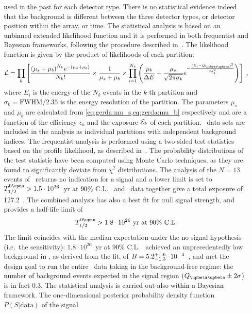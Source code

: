used in the past for each detector type. There is no statistical evidence indeed that the
background is different between the three detector types, or detector position within the
array, or time.
\newpar
The statistical analysis is based on an unbinned extended likelihood function and it is
performed in both frequentist and Bayesian frameworks, following the procedure described
in~\cite{Agostini2017}. The likelihood function is given by the product of likelihoods of
each partition:
\[
  \mathcal{L} = \prod_k \left[
    \frac{{(\mu_s + \mu_b)}^{N_k} e^{-(\mu_s + \mu_b)}}{N_k!} \times
    \frac{1}{\mu_s + \mu_b} \times
    \prod^{N_k}_{i=1} \left(
      \frac{\mu_b}{\Delta{}E} +
      \frac{\mu_s}{\sqrt{2\pi\sigma_k}} e^{-\frac{{(E_i - \qbbM)}^2}{2\sigma_k^2}}
    \right)
  \right] \;,
\]
where $E_i$ is the energy of the $N_k$ events in the $k$-th partition and $\sigma_k =
\text{FWHM}/2.35$ is the energy resolution of the partition. The parameters $\mu_s$ and
$\mu_b$ are calculated from \cref{eq:gerda:mu_s,eq:gerda:mu_b} respectively and are a
function of the efficiency $\epsilon_k$ and the exposure $\mathcal{E}_k$ of each partition.
\phaseone\ data sets are included in the analysis as individual partitions with
independent background indices.
\newpar
The frequentist analysis is performed using a two-sided test statistics based on the
profile likelihood, as described in~\cite{Agostini2017}. The probability distributions of
the test statistic have been computed using Monte Carlo techniques, as they are found to
significantly deviate from $\chi^2$ distributions. The analysis of the $N=13$ events of
\phasetwo\ returns no indication for a signal and a lower limit is set to $\thalfzeroM >
1.5 \cdot 10^{26}$~yr at 90\% C.L. \phaseone\ and \phasetwo\ data together give a total
exposure of 127.2~\kgyr. The combined analysis has also a best fit for null signal
strength, and provides a half-life limit of
\[
  \thalfzeroM > 1.8 \cdot 10^{26}~\text{yr at 90\% C.L.}
\]
The limit coincides with the median expectation under the no-signal hypothesis (i.e.~the
sensitivity): $1.8 \cdot 10^{26}$~yr at 90\% C.L. \gerda\ achieved an unprecedentedly low
background in \phasetwo, as derived from the fit, of $B = {5.2}\substack{+1.6 \\ -1.3}
\cdot 10^{-4}$~\ctsper, and met the design goal to run the entire \phaseone\ data taking
in the background-free regime: the number of background events expected in the signal
region ($\qbbM \pm 2\sigma$) is in fact 0.3.
\newpar
The statistical analysis is carried out also within a Bayesian framework. The
one-dimensional posterior probability density function $P(S|\text{data})$ of the signal
